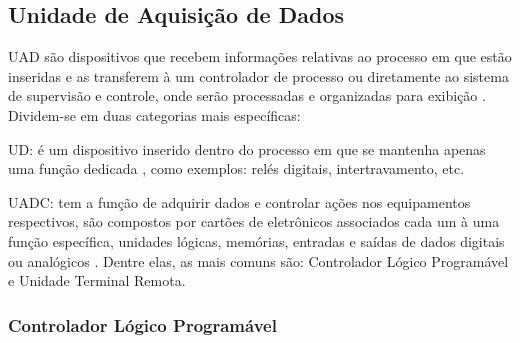         \begin{figure}[!h]
	    \end{figure}
        
    \subsection{Unidade de Aquisição de Dados}
    \label{sec:uad}

        \gls{UAD} são dispositivos que recebem informações relativas ao processo em que estão inseridas e as transferem à um controlador de processo ou diretamente ao sistema de supervisão e controle, onde serão processadas e organizadas para exibição  \cite{mamede-instalacoes}.
        \newpage
        Dividem-se em duas categorias mais específicas:
        
        \begin{alineascomponto}
        	\item \gls{UD}: é um dispositivo inserido dentro do processo em que se mantenha apenas uma função dedicada  \cite{mamede-instalacoes}, como exemplos: relés digitais, intertravamento, etc.
        	\item \gls{UADC}: 
        	tem a função de adquirir dados e controlar ações nos equipamentos respectivos, são compostos por cartões de eletrônicos associados cada um à uma função específica, unidades lógicas, memórias,  entradas e saídas de dados digitais ou analógicos \cite{mamede-instalacoes}. Dentre elas, as mais comuns são: Controlador Lógico Programável e Unidade Terminal Remota.
        \end{alineascomponto}

    \subsubsection{Controlador Lógico Programável}
    \label{sec:clp}

